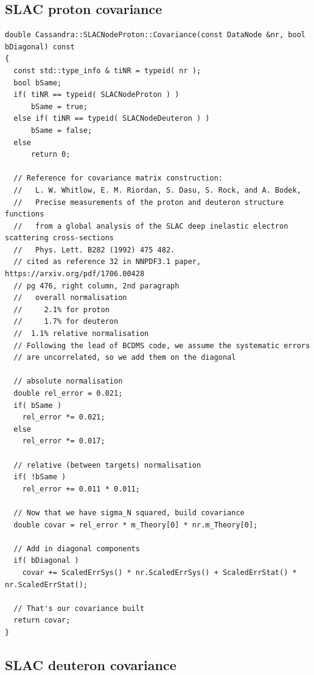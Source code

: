 \documentclass[12pt,a4paper]{report}
\begin{document}
\subsection{SLAC proton \cite{Whitlow} covariance}

\begin{Verbatim}[fontsize=\small]
double Cassandra::SLACNodeProton::Covariance(const DataNode &nr, bool bDiagonal) const
{
  const std::type_info & tiNR = typeid( nr );
  bool bSame;
  if( tiNR == typeid( SLACNodeProton ) )
      bSame = true;
  else if( tiNR == typeid( SLACNodeDeuteron ) )
      bSame = false;
  else
      return 0;

  // Reference for covariance matrix construction:
  //   L. W. Whitlow, E. M. Riordan, S. Dasu, S. Rock, and A. Bodek,
  //   Precise measurements of the proton and deuteron structure functions
  //   from a global analysis of the SLAC deep inelastic electron scattering cross-sections
  //   Phys. Lett. B282 (1992) 475 482.
  // cited as reference 32 in NNPDF3.1 paper, https://arxiv.org/pdf/1706.00428
  // pg 476, right column, 2nd paragraph
  //   overall normalisation
  //     2.1% for proton
  //     1.7% for deuteron
  //  1.1% relative normalisation
  // Following the lead of BCDMS code, we assume the systematic errors
  // are uncorrelated, so we add them on the diagonal

  // absolute normalisation
  double rel_error = 0.021;
  if( bSame )
    rel_error *= 0.021;
  else
    rel_error *= 0.017;

  // relative (between targets) normalisation
  if( !bSame )
    rel_error += 0.011 * 0.011;

  // Now that we have sigma_N squared, build covariance
  double covar = rel_error * m_Theory[0] * nr.m_Theory[0];

  // Add in diagonal components
  if( bDiagonal )
    covar += ScaledErrSys() * nr.ScaledErrSys() + ScaledErrStat() * nr.ScaledErrStat();

  // That's our covariance built
  return covar;
}
\end{Verbatim}

\subsection{SLAC deuteron \cite{Whitlow} covariance}
\end{document}
